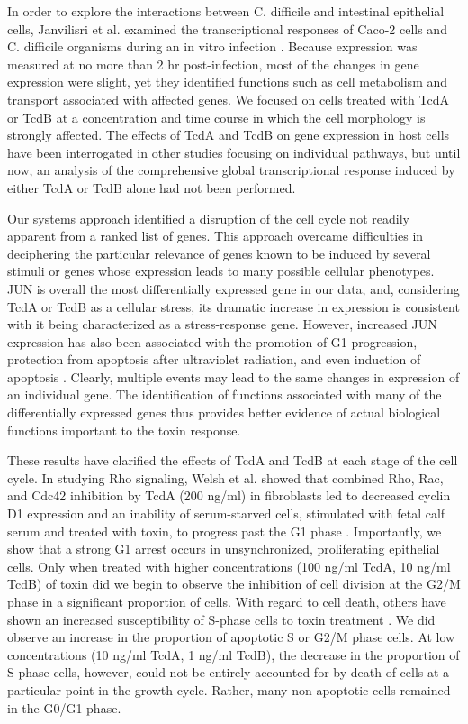 In order to explore the interactions between C. difficile and intestinal epithelial cells, Janvilisri et al. examined the transcriptional responses of Caco-2 cells and C. difficile organisms during an in vitro infection \cite{Janvilisri:2010wf}. Because expression was measured at no more than 2 hr post-infection, most of the changes in gene expression were slight, yet they identified functions such as cell metabolism and transport associated with affected genes. We focused on cells treated with TcdA or TcdB at a concentration and time course in which the cell morphology is strongly affected. The effects of TcdA and TcdB on gene expression in host cells have been interrogated in other studies focusing on individual pathways, but until now, an analysis of the comprehensive global transcriptional response induced by either TcdA or TcdB alone had not been performed.

Our systems approach identified a disruption of the cell cycle not readily apparent from a ranked list of genes. This approach overcame difficulties in deciphering the particular relevance of genes known to be induced by several stimuli or genes whose expression leads to many possible cellular phenotypes. JUN is overall the most differentially expressed gene in our data, and, considering TcdA or TcdB as a cellular stress, its dramatic increase in expression is consistent with it being characterized as a stress-response gene. However, increased JUN expression has also been associated with the promotion of G1 progression, protection from apoptosis after ultraviolet radiation, and even induction of apoptosis \cite{Ameyar:2003cc}. Clearly, multiple events may lead to the same changes in expression of an individual gene. The identification of functions associated with many of the differentially expressed genes thus provides better evidence of actual biological functions important to the toxin response. 

These results have clarified the effects of TcdA and TcdB at each stage of the cell cycle. In studying Rho signaling, Welsh et al. showed that combined Rho, Rac, and Cdc42 inhibition by TcdA (200 ng/ml) in fibroblasts led to decreased cyclin D1 expression and an inability of serum-starved cells, stimulated with fetal calf serum and treated with toxin, to progress past the G1 phase \cite{Welsh:2001id}. Importantly, we show that a strong G1 arrest occurs in unsynchronized, proliferating epithelial cells. Only when treated with higher concentrations (100 ng/ml TcdA, 10 ng/ml TcdB) of toxin did we begin to observe the inhibition of cell division at the G2/M phase in a significant proportion of cells. With regard to cell death, others have shown an increased susceptibility of S-phase cells to toxin treatment \cite{Huelsenbeck:2007df}. We did observe an increase in the proportion of apoptotic S or G2/M phase cells. At low concentrations (10 ng/ml TcdA, 1 ng/ml TcdB), the decrease in the proportion of S-phase cells, however, could not be entirely accounted for by death of cells at a particular point in the growth cycle. Rather, many non-apoptotic cells remained in the G0/G1 phase.


